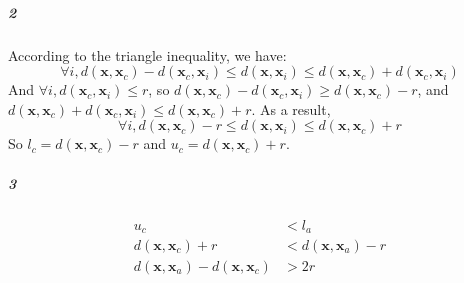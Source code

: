 \documentclass[22pt]{article}
\begin{document}
		\subparagraph{2}According to the triangle inequality, we have:
		\begin{equation}
			\forall i,d(\mathbf{x},\mathbf{x}_c)-d(\mathbf{x}_c,\mathbf{x}_i) \leq d(\mathbf{x},\mathbf{x}_i) \leq d(\mathbf{x},\mathbf{x}_c)+d(\mathbf{x}_c,\mathbf{x}_i)
		\end{equation}
		And $\forall i, d(\mathbf{x}_c,\mathbf{x}_i) \leq r$, so $d(\mathbf{x},\mathbf{x}_c)-d(\mathbf{x}_c,\mathbf{x}_i)\geq d(\mathbf{x},\mathbf{x}_c)-r$, and $d(\mathbf{x},\mathbf{x}_c)+d(\mathbf{x}_c,\mathbf{x}_i)\leq d(\mathbf{x},\mathbf{x}_c)+r$. As a result,
		\begin{equation}
			\forall i,d(\mathbf{x},\mathbf{x}_c)-r \leq d(\mathbf{x},\mathbf{x}_i) \leq d(\mathbf{x},\mathbf{x}_c)+r
		\end{equation}
		So $l_c = d(\mathbf{x},\mathbf{x}_c)-r$ and $u_c = d(\mathbf{x},\mathbf{x}_c)+r$.

		\subparagraph{3}
		\begin{align}
			u_c &<l_a\\
			d(\mathbf{x},\mathbf{x}_c)+r &< d(\mathbf{x},\mathbf{x}_a)-r\\
			d(\mathbf{x},\mathbf{x}_a) - d(\mathbf{x},\mathbf{x}_c) &> 2r
		\end{align}
\end{document}
